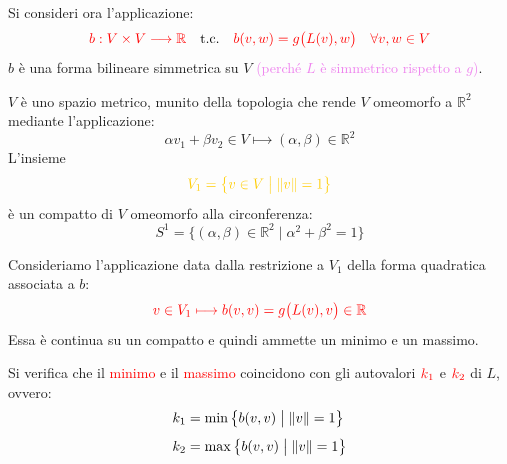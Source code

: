         Si consideri ora l'applicazione:
        \[
        \textcolor{red}{b : V \times V \longrightarrow \mathbb{R}} \quad \text{t.c.} \quad \textcolor{red}{b(v,w) = g\big(L(v), w\big) \quad \forall v, w \in V}
        \]
        $b$ è una forma bilineare simmetrica su $V$ \textcolor{violet}{(perché $L$ è simmetrico rispetto a $g$)}. 

        $V$ è uno spazio metrico, munito della topologia che rende $V$ omeomorfo a $\mathbb{R}^2$ mediante l'applicazione:
        \[
        \alpha v_1 + \beta v_2 \in V \stackrel{\qquad}{\longmapsto} (\alpha, \beta) \in \mathbb{R}^2
        \]
        L'insieme
        \[
        \textcolor{amber}{V_1 = \big\{ v \in V \;\big|\; \norm{v} = 1 \big\}}
        \]
        è un compatto di $V$ omeomorfo alla circonferenza:
        \[
        S^1 = \big\{ (\alpha, \beta) \in \mathbb{R}^2 \;\big|\; \alpha^2 + \beta^2 = 1 \big\}
        \]
        \newpage
        \begin{proposizione}
        \label{prop:minmax-autovalori}
        Consideriamo l'applicazione data dalla restrizione a \textcolor{amber}{$V_1$} della forma quadratica associata a $b$:
        \[
        \textcolor{red}{v \in V_1 \longmapsto b(v,v) = g\big(L(v), v\big) \in \mathbb{R}}
        \]
        Essa è continua su un compatto e quindi ammette un minimo e un massimo. 
        
        Si verifica che il \textcolor{red}{minimo} e il \textcolor{red}{massimo}
        coincidono con gli autovalori $\textcolor{red}{k_1}$ e $\textcolor{red}{k_2}$ di $L$, ovvero:
        \begin{align*}
        k_1 &= \min \big\{ b(v,v) \;\big|\; \lVert v\rVert = 1 \big\} \\[4pt]
        k_2 &= \max \big\{ b(v,v) \;\big|\; \lVert v\rVert = 1 \big\}
        \end{align*}
        \end{proposizione}

